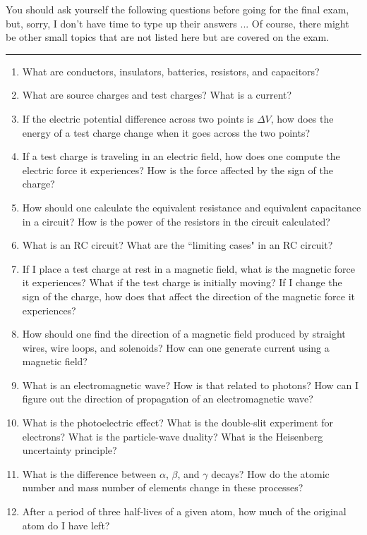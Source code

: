 \documentclass[11pt]{article}
\begin{document}
\vfill
\noindent You should ask yourself the following questions before going for the final exam, but, sorry, I don't have time to type up their answers ... Of course, there might be other small topics that are not listed here but are covered on the exam.\\
\noindent\rule{8cm}{0.4pt}
\begin{enumerate}
\item What are conductors, insulators, batteries, resistors, and capacitors?
\item What are source charges and test charges? What is a current?
\item If the electric potential difference across two points is $\Delta V$, how does the energy of a test charge change when it goes across the two points?
\item If a test charge is traveling in an electric field, how does one compute the electric force it experiences? How is the force affected by the sign of the charge?
\item How should one calculate the equivalent resistance and equivalent capacitance in a circuit? How is the power of the resistors in the circuit calculated?
\item What is an RC circuit? What are the ``limiting cases" in an RC circuit?
\item If I place a test charge at rest in a magnetic field, what is the magnetic force it experiences? What if the test charge is initially moving? If I change the sign of the charge, how does that affect the direction of the magnetic force it experiences?
\item How should one find the direction of a magnetic field produced by straight wires, wire loops, and solenoids? How can one generate current using a magnetic field? 
\item What is an electromagnetic wave? How is that related to photons? How can I figure out the direction of propagation of an electromagnetic wave?
\item What is the photoelectric effect? What is the double-slit experiment for electrons? What is the particle-wave duality? What is the Heisenberg uncertainty principle?
\item What is the difference between $\alpha$, $\beta$, and $\gamma$ decays? How do the atomic number and mass number of elements change in these processes?
\item After a period of three half-lives of a given atom, how much of the original atom do I have left? 
\end{enumerate}
\end{document}
